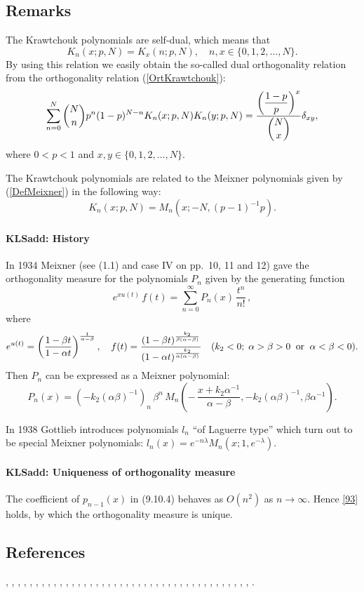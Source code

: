 \documentclass[envcountchap,graybox]{svmono}
\newcounter{rom}
\newcommand\al\alpha
\newcommand\be\beta
\newcommand\la\lambda
\newcommand\iy\infty
\begin{document}
\subsection*{Remarks}
The Krawtchouk polynomials are self-dual, which means that
$$K_n(x;p,N)=K_x(n;p,N),\quad n,x\in\{0,1,2,\ldots,N\}.$$
By using this relation we easily obtain the so-called dual orthogonality
relation from the orthogonality relation (\ref{OrtKrawtchouk}):
$$\sum_{n=0}^N\binom{N}{n}p^n(1-p)^{N-n} K_n(x;p,N)K_n(y;p,N)=
\frac{\displaystyle\left(\frac{1-p}{p}\right)^x}{\dbinom{N}{x}}\delta_{xy},$$
where $0 < p < 1$ and $x,y\in\{0,1,2,\ldots,N\}$.

\noindent
The Krawtchouk polynomials are related to the Meixner polynomials given by (\ref{DefMeixner})
in the following way:
$$K_n(x;p,N)=M_n(x;-N,(p-1)^{-1}p).$$
\paragraph{\large\bf KLSadd: History}In 1934 Meixner  (see
(1.1) and case IV on pp.~10, 11 and 12) gave the orthogonality
measure for the polynomials $P_n$ given by the generating function
\[
e^{x u(t)}\,f(t)=\sum_{n=0}^\iy P_n(x)\,\frac{t^n}{n!}\,,
\]
where
\[
e^{u(t)}=\left(\frac{1-\be t}{1-\al t}\right)^{\frac1{\al-\be}},\quad
f(t)=\frac{(1-\be t)^{\frac{k_2}{\be(\al-\be)}}}{(1-\al t)^{\frac{k_2}{\al(\al-\be)}}}\quad
(k_2<0;\;\al>\be>0\;\;{\rm or}\;\;\al<\be<0).
\]
Then $P_n$ can be expressed as a Meixner polynomial:
\[
P_n(x)=(-k_2(\al\be)^{-1})_n\,\be^n\,
M_n\left(-\,\frac{x+k_2\al^{-1}}{\al-\be},-k_2(\al\be)^{-1},\be\al^{-1}\right).
\]

In 1938 Gottlieb \cite[\S2]{K1} introduces polynomials $l_n$ ``of Laguerre type''
which turn out to be special Meixner polynomials:
$l_n(x)=e^{-n\la} M_n(x;1,e^{-\la})$.
%
\paragraph{\large\bf KLSadd: Uniqueness of orthogonality measure}The coefficient of $p_{n-1}(x)$ in (9.10.4) behaves as $O(n^2)$ as $n\to\iy$.
Hence \eqref{93} holds, by which the orthogonality measure is unique.
%
\subsection*{References}
\cite{AlSalam90}, \cite{AndrewsAskey85}, \cite{Area+II}, \cite{Askey75}, \cite{Askey89I},
\cite{AskeyGasper77}, \cite{AskeyWilson85}, \cite{AtakRahmanSuslov}, \cite{Campigotto+},
\cite{LChiharaStanton}, \cite{Chihara78}, \cite{Dette95}, \cite{Dominici}, \cite{Dunkl76},
\cite{Dunkl84}, \cite{DunklRamirez}, \cite{Erdelyi+}, \cite{FeinsilverSchott},
\cite{Gasper73I}, \cite{Gasper74}, \cite{HoareRahman}, \cite{Ismail2005II}, \cite{Karlin58},
\cite{Koorn82}, \cite{Koorn88}, \cite{LabelleYehI}, \cite{LabelleYehII}, \cite{Lesky62},
\cite{Lesky89}, \cite{Lesky94I}, \cite{Lesky95II}, \cite{LewanowiczII}, \cite{Nikiforov+},
\cite{NikiforovUvarov}, \cite{Qiu}, \cite{Rahman78I}, \cite{Rahman79}, \cite{Stanton84},
\cite{Stanton90}, \cite{Szego75}, \cite{Zarzo+}, \cite{Zeng90}.
\end{document}
